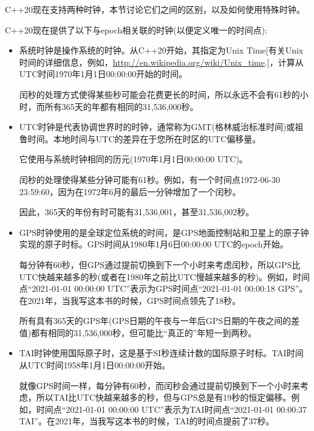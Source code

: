 
C++20现在支持两种时钟，本节讨论它们之间的区别，以及如何使用特殊时钟。


C++20现在提供了以下与epoch相关联的时钟(以便定义唯一的时间点):

\begin{itemize}
\item
系统时钟是操作系统的时钟。从C++20开始，其指定为Unix Time[有关Unix时间的详细信息，例如，\url{http://en.wikipedia.org/wiki/Unix_time}.]，计算从UTC时间1970年1月1日00:00:00开始的时间。

闰秒的处理方式使得某些秒可能会花费更长的时间，所以永远不会有61秒的小时，而所有365天的年都有相同的31,536,000秒。

\item
UTC时钟是代表协调世界时的时钟，通常称为GMT(格林威治标准时间)或祖鲁时间。本地时间与UTC的差异在于您所在时区的UTC偏移量。

它使用与系统时钟相同的历元(1970年1月1日00:00:00 UTC)。

闰秒的处理使得某些分钟可能有61秒。例如，有一个时间点1972-06-30 23:59:60，因为在1972年6月的最后一分钟增加了一个闰秒。

因此，365天的年份有时可能有31,536,001，甚至31,536,002秒。

\item
GPS时钟使用的是全球定位系统的时间，是GPS地面控制站和卫星上的原子钟实现的原子时标。GPS时间从1980年1月6日00:00:00 UTC的epoch开始。

每分钟有60秒，但GPS通过提前切换到下一个小时来考虑闰秒，所以GPS比UTC快越来越多的秒(或者在1980年之前比UTC慢越来越多的秒)。例如，时间点“2021-01-01 00:00:00 UTC”表示为GPS时间点“2021-01-01 00:00:18 GPS”。在2021年，当我写这本书的时候，GPS时间点领先了18秒。

所有具有365天的GPS年(GPS日期的午夜与一年后GPS日期的午夜之间的差值)都有相同的31,536,000秒，但可能比“真正的”年短一到两秒。

\item
TAI时钟使用国际原子时，这是基于SI秒连续计数的国际原子时标。TAI时间从UTC时间1958年1月1日00:00:00开始。

就像GPS时间一样，每分钟有60秒，而闰秒会通过提前切换到下一个小时来考虑，所以TAI比UTC快越来越多的秒，但与GPS总是有19秒的恒定偏移。例如，时间点“2021-01-01 00:00:00 UTC”表示为TAI时间点“2021-01-01 00:00:37 TAI”。在2021年，当我写这本书的时候，TAI的时间点提前了37秒。
\end{itemize}



